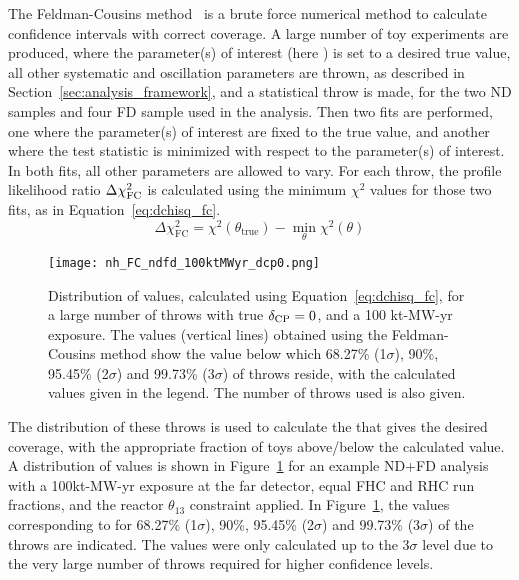 The Feldman-Cousins method~\cite{Feldman:1997qc} is a brute force numerical method to calculate confidence intervals with correct coverage. A large number of toy experiments are produced, where the parameter(s) of interest (here \deltacp) is set to a desired true value, all other systematic and oscillation parameters are thrown, as described in Section~\ref{sec:analysis_framework}, and a statistical throw is made, for the two ND samples and four FD sample used in the analysis. Then two fits are performed, one where the parameter(s) of interest are fixed to the true value, and another where the test statistic is minimized with respect to the parameter(s) of interest. In both fits, all other parameters are allowed to vary. For each throw, the profile likelihood ratio $\Delta\chi^{2}_{\mathrm{FC}}$ is calculated using the minimum $\chi^{2}$ values for those two fits, as in Equation~\ref{eq:dchisq_fc}.
\begin{equation}
  \Delta\chi^{2}_{\mathrm{FC}} = \chi^{2}(\theta_{\mathrm{true}}) - \min_{\theta}\chi^{2}(\theta)
  \label{eq:dchisq_fc}
\end{equation}
\begin{figure}[htbp]
  \centering
  \texttt{[image: nh\_FC\_ndfd\_100ktMWyr\_dcp0.png]}
  \caption{Distribution of \dchisq values, calculated using Equation~\ref{eq:dchisq_fc}, for a large number of throws with true $\delta_{\rm CP} = 0$, and a 100 kt-MW-yr exposure. The \dchisqcrit values (vertical lines) obtained using the Feldman-Cousins method show the \dchisq value below which 68.27\% (1$\sigma$), 90\%, 95.45\% (2$\sigma$) and 99.73\% (3$\sigma$) of throws reside, with the calculated values given in the legend. The number of throws used is also given.}
  \label{fig:fc_throws}
\end{figure}
The distribution of these throws is used to calculate the \dchisqcrit that gives the desired coverage, with the appropriate fraction of toys above/below the calculated value. A distribution of \dchisq values is shown in Figure~\ref{fig:fc_throws} for an example ND+FD analysis with a 100kt-MW-yr exposure at the far detector, equal FHC and RHC run fractions, and the reactor $\theta_{13}$ constraint applied. In Figure~\ref{fig:fc_throws}, the \dchisqcrit values corresponding to for 68.27\% (1$\sigma$), 90\%, 95.45\% (2$\sigma$) and 99.73\% (3$\sigma$) of the throws are indicated. The \dchisqcrit values were only calculated up to the 3$\sigma$ level due to the very large number of throws required for higher confidence levels.

